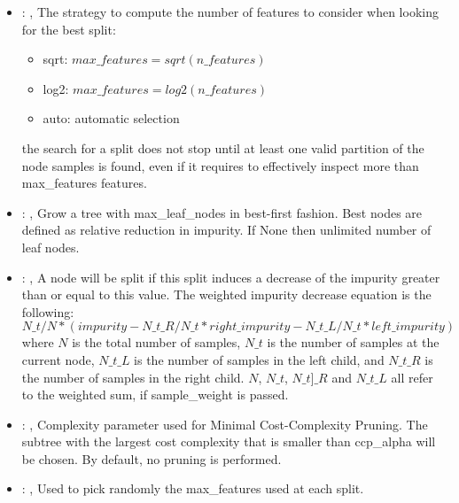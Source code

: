 \begin{itemize}
    \item {}: , 
      The strategy to compute the number of features to consider when looking for the best split:
      \begin{itemize}                                                     \item sqrt:
      $max\_features=sqrt(n\_features)$                                                     \item
      log2: $max\_features=log2(n\_features)$
      \item auto: automatic selection
      \end{itemize}                                                   \nb the search for a split
      does not stop until at least one valid partition of the node
      samples is found, even if it requires to effectively inspect more than max\_features features.

    \item {}: , 
      Grow a tree with max\_leaf\_nodes in best-first fashion. Best nodes are defined as relative
      reduction                                                  in impurity. If None then unlimited
      number of leaf nodes.

    \item {}: , 
      A node will be split if this split induces a decrease of the impurity greater than or equal to
      this value.                                                  The weighted impurity decrease
      equation is the following:                                                  $N\_t / N *
      (impurity - N\_t\_R / N\_t * right\_impurity - N\_t\_L / N\_t * left\_impurity)$
      where $N$ is the total number of samples, $N\_t$ is the number of samples at the current node,
      $N\_t\_L$ is the number                                                  of samples in the
      left child, and $N\_t\_R$ is the number of samples in the right child.
      $N$, $N\_t$, $N\_t]\_R$ and $N\_t\_L$ all refer to the weighted sum, if sample\_weight is
      passed.

    \item {}: , 
      Complexity parameter used for Minimal Cost-Complexity Pruning. The subtree with the largest
      cost                                                  complexity that is smaller than
      ccp\_alpha will be chosen. By default, no pruning is performed.

    \item {}: , 
      Used to pick randomly the max\_features used at each split.
  \end{itemize}



